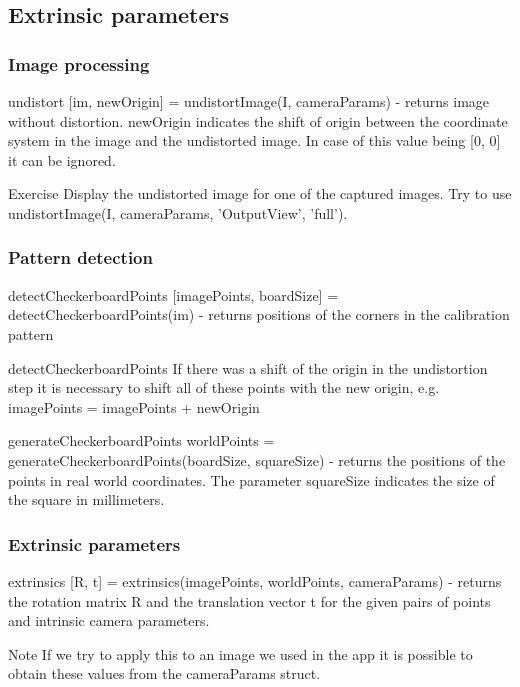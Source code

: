 \documentclass{beamer}
\begin{document}
\subsection{Extrinsic parameters}
\begin{frame}
\frametitle{Image processing}
\begin{block}{undistort}
[im, newOrigin] = undistortImage(I, cameraParams) - returns image without distortion. newOrigin indicates the shift of origin between the coordinate system in the image and the undistorted image. In case of this value being [0, 0] it can be ignored.
\end{block}

\begin{block}{Exercise}
Display the undistorted image for one of the captured images. Try to use undistortImage(I, cameraParams, 'OutputView', 'full').
\end{block}

\end{frame}

\begin{frame}
\frametitle{Pattern detection}
\begin{block}{detectCheckerboardPoints}
[imagePoints, boardSize] = detectCheckerboardPoints(im) - returns positions of the corners in the calibration pattern
\end{block}

\begin{alertblock}{detectCheckerboardPoints}
If there was a shift of the origin in the undistortion step it is necessary to shift all of these points with the new origin, e.g. imagePoints = imagePoints + newOrigin
\end{alertblock}

\begin{block}{generateCheckerboardPoints}
worldPoints = generateCheckerboardPoints(boardSize, squareSize) - returns the positions of the points in real world coordinates. The parameter squareSize indicates the size of the square in millimeters.
\end{block}
\end{frame}

\begin{frame}
\frametitle{Extrinsic parameters}

\begin{block}{extrinsics}
[R, t] = extrinsics(imagePoints, worldPoints, cameraParams) - returns the rotation matrix R and the translation vector t for the given pairs of points and intrinsic camera parameters.
\end{block}

\begin{block}{Note}
If we try to apply this to an image we used in the app it is possible to obtain these values from the cameraParams struct.
\end{block}
\end{frame}
\end{document}
